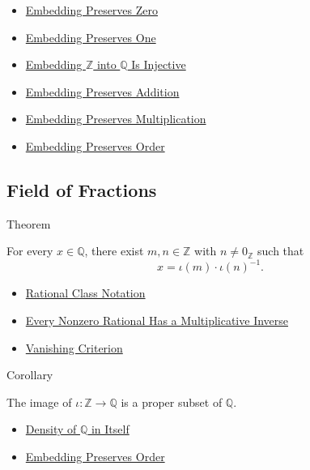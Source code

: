 \begin{dependencies}
\begin{itemize}
  \item \hyperref[thm:embedding-z-into-q-preserves-zero]{Embedding Preserves Zero}
  \item \hyperref[thm:embedding-z-into-q-preserves-one]{Embedding Preserves One}
  \item \hyperref[thm:embedding-z-into-q-injective]{Embedding $\mathbb{Z}$ into $\mathbb{Q}$ Is Injective}
  \item \hyperref[thm:embedding-z-into-q-preserves-addition]{Embedding Preserves Addition}
  \item \hyperref[thm:embedding-z-into-q-preserves-multiplication]{Embedding Preserves Multiplication}
  \item \hyperref[thm:embedding-z-into-q-preserves-order]{Embedding Preserves Order}
\end{itemize}
\end{dependencies}

\subsection*{Field of Fractions}

\begin{theorembox}{Theorem}
\begin{theorem}
\label{thm:q-is-field-of-fractions-of-z}
For every $x\in\mathbb{Q}$, there exist $m,n\in\mathbb{Z}$ with
$n\ne0_{\mathbb{Z}}$ such that
\[
x=\iota(m)\cdot \iota(n)^{-1}.
\]
\end{theorem}
\end{theorembox}

\begin{dependencies}
\begin{itemize}
  \item \hyperref[def:rational-class-notation]{Rational Class Notation}
  \item \hyperref[thm:every-nonzero-rational-has-multiplicative-inverse]{Every Nonzero Rational Has a Multiplicative Inverse}
  \item \hyperref[lem:vanishing-criterion-q]{Vanishing Criterion}
\end{itemize}
\end{dependencies}

\begin{corollarybox}{Corollary}
\begin{corollary}
\label{cor:embedding-z-into-q-not-surjective}
The image of $\iota:\mathbb{Z}\to\mathbb{Q}$ is a proper subset of
\(\mathbb{Q}\).
\end{corollary}
\end{corollarybox}

\begin{dependencies}
\begin{itemize}
  \item \hyperref[thm:density-of-q]{Density of $\mathbb{Q}$ in Itself}
  \item \hyperref[thm:embedding-z-into-q-preserves-order]{Embedding Preserves Order}
\end{itemize}
\end{dependencies}
